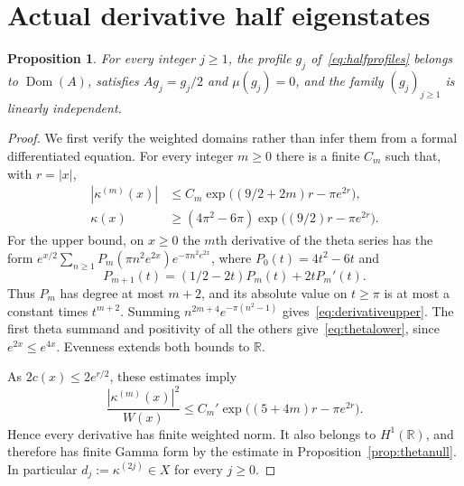\documentclass[11pt,a4paper]{article}
\numberwithin{equation}{section}
\newtheorem{proposition}[theorem]{Proposition}
\theoremstyle{definition}
\theoremstyle{remark}
\newcommand{\R}{\mathbb R}
\newcommand{\dom}{\operatorname{Dom}}
\begin{document}
\section{Actual derivative half eigenstates}\label{app:half}

\begin{proposition}\label{prop:halfeigen}
For every integer $j\ge1$, the profile $g_j$ of~\eqref{eq:halfprofiles} belongs to $\dom(A)$, satisfies $Ag_j=g_j/2$ and $\mu(g_j)=0$, and the family $(g_j)_{j\ge1}$ is linearly independent.
\end{proposition}
\begin{proof}
We first verify the weighted domains rather than infer them from a formal differentiated equation. For every integer $m\ge0$ there is a finite $C_m$ such that, with $r=|x|$,
\begin{align}
 |\kappa^{(m)}(x)|
   &\le C_m\exp\!\bigl((9/2+2m)r-\pi e^{2r}\bigr),\label{eq:derivativeupper}\\
 \kappa(x)&\ge(4\pi^2-6\pi)
           \exp\!\bigl((9/2)r-\pi e^{2r}\bigr).\label{eq:thetalower}
\end{align}
For the upper bound, on $x\ge0$ the $m$th derivative of the theta series has the form
$e^{x/2}\sum_{n\ge1}P_m(\pi n^2e^{2x})e^{-\pi n^2e^{2x}}$,
where $P_0(t)=4t^2-6t$ and
\[
 P_{m+1}(t)=(1/2-2t)P_m(t)+2tP_m'(t).
\]
Thus $P_m$ has degree at most $m+2$, and its absolute value on $t\ge\pi$ is at most a constant times $t^{m+2}$. Summing
$n^{2m+4}e^{-\pi(n^2-1)}$ gives~\eqref{eq:derivativeupper}. The first theta summand and positivity of all the others give~\eqref{eq:thetalower}, since $e^{2x}\le e^{4x}$. Evenness extends both bounds to $\R$.

As $2c(x)\le2e^{r/2}$, these estimates imply
\begin{equation}\label{eq:derivativeweighted}
 \frac{|\kappa^{(m)}(x)|^2}{W(x)}
    \le C_m'\exp\!\bigl((5+4m)r-\pi e^{2r}\bigr).
\end{equation}
Hence every derivative has finite weighted norm. It also belongs to $H^1(\R)$, and therefore has finite Gamma form by the estimate in Proposition~\ref{prop:thetanull}. In particular $d_j:=\kappa^{(2j)}\in X$ for every $j\ge0$.


\end{proof}
\end{document}
